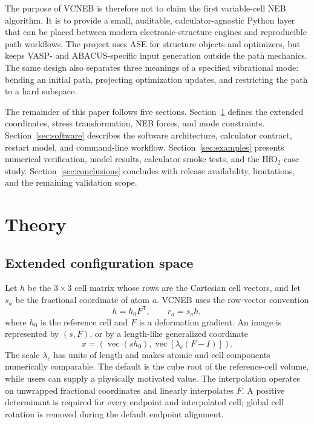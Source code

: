 \documentclass[final,3p,times]{elsarticle}
\begin{document}
The purpose of VCNEB is therefore not to claim the first variable-cell NEB
algorithm.  It is to provide a small, auditable, calculator-agnostic Python
layer that can be placed between modern electronic-structure engines and
reproducible path workflows.  The project uses ASE for structure objects and
optimizers, but keeps VASP- and ABACUS-specific input generation outside the
path mechanics.  The same design also separates three meanings of a specified
vibrational mode: bending an initial path, projecting optimization updates,
and restricting the path to a hard subspace.

The remainder of this paper follows five sections.  Section~\ref{sec:theory}
defines the extended coordinates, stress transformation, NEB forces, and mode
constraints.  Section~\ref{sec:software} describes the software architecture,
calculator contract, restart model, and command-line workflow.
Section~\ref{sec:examples} presents numerical verification, model results,
calculator smoke tests, and the HfO$_2$ case study.  Section~\ref{sec:conclusions}
concludes with release availability, limitations, and the remaining validation
scope.

\section{Theory}
\label{sec:theory}

\subsection{Extended configuration space}

Let $h$ be the $3\times3$ cell matrix whose rows are the Cartesian cell
vectors, and let $s_a$ be the fractional coordinate of atom $a$.  VCNEB uses
the row-vector convention
\begin{equation}
  h = h_0 F^{\mathsf T}, \qquad r_a=s_a h,
  \label{eq:cell_convention}
\end{equation}
where $h_0$ is the reference cell and $F$ is a deformation gradient.  An
image is represented by $(s,F)$, or by a length-like generalized coordinate
\begin{equation}
  x = \left(\operatorname{vec}(s h_0),
       \operatorname{vec}\left[\lambda_c(F-I)\right]\right).
  \label{eq:extended_coordinate}
\end{equation}
The scale $\lambda_c$ has units of length and makes atomic and cell
components numerically comparable.  The default is the cube root of the
reference-cell volume, while users can supply a physically motivated value.
The interpolation operates on unwrapped fractional coordinates and linearly
interpolates $F$.  A positive determinant is required for every endpoint and
interpolated cell; global cell rotation is removed during the default endpoint
alignment.
\end{document}
